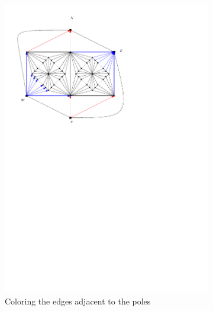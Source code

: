   \begin{figure}[h]
    \centering

    \begin{subfigure}[t]{0.3\textwidth}
      \includegraphics[width=\textwidth]{fixExtension/img/manymany1}
      \caption{Coloring the edges adjacent to the poles}
      \label{fig:fix:manymany1}
    \end{subfigure}
    \quad
    \begin{subfigure}[t]{0.3\textwidth}

\end{subfigure}
\end{figure}
